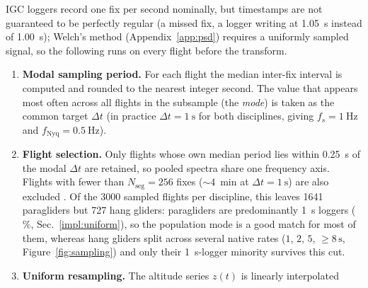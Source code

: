 IGC loggers record one fix per
second nominally, but timestamps are not guaranteed to be perfectly regular (a missed
fix, a logger writing at \SI{1.05}{\second} instead of \SI{1.00}{\second}); Welch's
method (Appendix~\ref{app:psd}) requires a uniformly sampled signal, so the following
runs on every flight before the transform.
\begin{enumerate}[label=(\roman*)]
  \item \textbf{Modal sampling period.} For each flight the median inter-fix interval is
        computed and rounded to the nearest integer second. The value that appears most
        often across all flights in the subsample (the \emph{mode}) is taken as the
        common target $\Delta t$ (in practice $\Delta t=\SI{1}{\second}$ for both
        disciplines, giving $f_s=\SI{1}{\hertz}$ and $f_{\text{Nyq}}=\SI{0.5}{\hertz}$).
  \item \textbf{Flight selection.} Only flights whose own median period lies within
        \SI{0.25}{\second} of the modal $\Delta t$ are retained, so pooled spectra share
        one frequency axis.  Flights with fewer than $N_{\text{seg}}=256$ fixes
        ($\sim$\SI{4}{\minute} at $\Delta t=\SI{1}{\second}$) are also excluded
        . Of the \num{3000} sampled flights per
        discipline, this leaves \num{1641} paragliders but \num{727} hang gliders:
        paragliders are predominantly \SI{1}{\second} loggers
        (\StatScanParaDtOneSecPct\,\%, Sec.~\ref{impl:uniform}), so the population mode is
        a good match for most of them, whereas hang gliders split across several native
        rates ($1$, $2$, $5$, $\geq\!8\,\text{s}$, Figure~\ref{fig:sampling}) and only
        their \SI{1}{\second}-logger minority survives this cut.
  \item \textbf{Uniform resampling.} The altitude series $z(t)$ is linearly interpolated

\end{enumerate}
